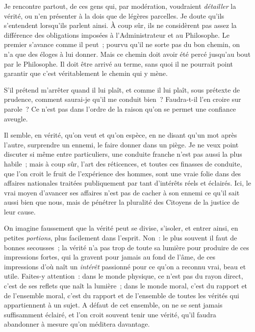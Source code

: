 \documentclass[french,twoside]{book} %
\begin{document}
Je rencontre partout, de ces gens qui, par modération, voudraient {\itshape détailler} la vérité, ou n’en présenter à la dois que de légères parcelles. Je doute qu’ils s’entendent lorsqu’ils parlent ainsi. À coup sûr, ils ne considèrent pas assez la différence des obligations imposées à l’Administrateur et au Philosophe. Le premier s’avance comme il peut ; pourvu qu’il ne sorte pas du bon chemin, on n’a que des éloges à lui donner. Mais ce chemin doit avoir été percé jusqu’au bout par le Philosophe. Il doit être arrivé au terme, sans quoi il ne pourrait point garantir que c’est véritablement le chemin qui y mène.\par
S’il prétend m’arrêter quand il lui plaît, et comme il lui plaît, sous prétexte de prudence, comment saurai-je qu’il me conduit bien ? Faudra-t-il l’en croire sur parole ? Ce n’est pas dans l’ordre de la raison qu’on se permet une confiance aveugle.\par
Il semble, en vérité, qu’on veut et qu’on espèce, en ne disant qu’un mot après l’autre, surprendre un ennemi, le faire donner dans un piège. Je ne veux point discuter si même entre particuliers, une conduite franche n’est pas aussi la plus habile ; mais à coup sûr, l’art des réticences, et toutes ces finasses de conduite, que l’on croit le fruit de l’expérience des hommes, sont une vraie folie dans des affaires nationales traitées publiquement par tant d’intérêts réels et éclairés. Ici, le vrai moyen d’avancer ses affaires n’est pas de cacher à son ennemi ce qu’il sait aussi bien que nous, mais de pénétrer la pluralité des Citoyens de la justice de leur cause.\par
On imagine faussement que la vérité peut se divise, s’isoler, et entrer ainsi, en petites {\itshape portions}, plus facilement dans l’esprit. Non : le plus souvent il faut de bonnes secousses ; la vérité n’a pas trop de toute sa lumière pour produire de ces impressions fortes, qui la gravent pour jamais au fond de l’âme, de ces impressions d’où naît un {\itshape intérêt} passionné pour ce qu’on a reconnu vrai, beau et utile. Faites-y attention : dans le monde physique, ce n’est pas du rayon direct, c’est de ses reflets que naît la lumière ; dans le monde moral, c’est du rapport et de l’ensemble moral, c’est du rapport et de l’ensemble de toutes les vérités qui appartiennent à un sujet. A défaut de cet ensemble, on ne se sent jamais suffisamment éclairé, et l’on croit souvent tenir une vérité, qu’il faudra abandonner à mesure qu’on méditera davantage.\par
\end{document}
